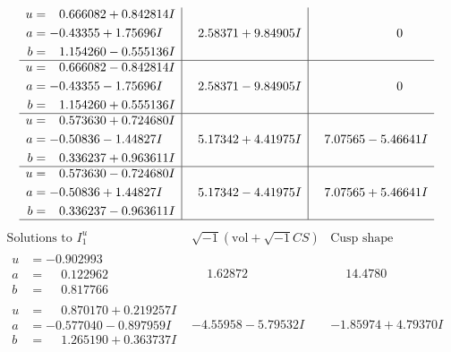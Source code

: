 \documentclass[1p]{elsarticle_modified}
\theoremstyle{definition}
\newcommand{\I}{\sqrt{-1}}
\begin{document}
$$\begin{array}{c|c|c}
\begin{aligned}
u &= \phantom{-}0.666082 + 0.842814 I \\
a &= -0.43355 + 1.75696 I \\
b &= \phantom{-}1.154260 - 0.555136 I\end{aligned}
 & \phantom{-}2.58371 + 9.84905 I & \phantom{-0.000000 } 0 \\ \hline\begin{aligned}
u &= \phantom{-}0.666082 - 0.842814 I \\
a &= -0.43355 - 1.75696 I \\
b &= \phantom{-}1.154260 + 0.555136 I\end{aligned}
 & \phantom{-}2.58371 - 9.84905 I & \phantom{-0.000000 } 0 \\ \hline\begin{aligned}
u &= \phantom{-}0.573630 + 0.724680 I \\
a &= -0.50836 - 1.44827 I \\
b &= \phantom{-}0.336237 + 0.963611 I\end{aligned}
 & \phantom{-}5.17342 + 4.41975 I & \phantom{-}7.07565 - 5.46641 I \\ \hline\begin{aligned}
u &= \phantom{-}0.573630 - 0.724680 I \\
a &= -0.50836 + 1.44827 I \\
b &= \phantom{-}0.336237 - 0.963611 I\end{aligned}
 & \phantom{-}5.17342 - 4.41975 I & \phantom{-}7.07565 + 5.46641 I\\
 \hline 
 \end{array}$$\newpage$$\begin{array}{c|c|c}  
\text{Solutions to }I^u_{1}& \I (\text{vol} + \sqrt{-1}CS) & \text{Cusp shape}\\
 \hline 
\begin{aligned}
u &= -0.902993\phantom{ +0.000000I} \\
a &= \phantom{-}0.122962\phantom{ +0.000000I} \\
b &= \phantom{-}0.817766\phantom{ +0.000000I}\end{aligned}
 & \phantom{-}1.62872\phantom{ +0.000000I} & \phantom{-}14.4780\phantom{ +0.000000I} \\ \hline\begin{aligned}
u &= \phantom{-}0.870170 + 0.219257 I \\
a &= -0.577040 - 0.897959 I \\
b &= \phantom{-}1.265190 + 0.363737 I\end{aligned}
 & -4.55958 - 5.79532 I & -1.85974 + 4.79370 I \\ \hline\begin{aligned}

\end{aligned}
\end{array}$$
\end{document}
